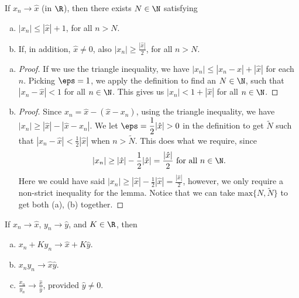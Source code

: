 \begin{nlemma}{}
	If \(x_n\to\hat{x}\) (in \(\R\)), then there exists \(N\in\N\) satisfying 
	\begin{enumerate}[(a)]
		\item \(|x_n|\leq |\hat{x}|+1\), for all \(n>N\).
		
		\item If, in addition, \(\hat{x}\neq 0\), also \(|x_n|\geq \displaystyle\frac{|\hat{x}|}{2}\), for all \(n>N\).
	\end{enumerate}
\end{nlemma}
\begin{enumerate}[(a)]
	\item 
	\begin{proof}
		If we use the triangle inequality, we have
		\(|x_n|\leq |x_n-\hat{x}|+|\hat{x}|\) for each \(n\). Picking \(\eps=1\), we apply the definition to find an \(N\in\N\), such that \(|x_n-\hat{x}|<1\) for all \(n\in\N\). This gives us \(|x_n|<1+|\hat{x}|\) for all \(n\in\N\). 
	\end{proof}
	
	\item 
	\begin{proof}
		Since \(x_n=\hat{x}-(\hat{x}-x_n)\), using the triangle inequality, we have \(|x_n|\geq |\hat{x}|-|\hat{x}-x_n|\). We let \(\eps=\displaystyle\frac{1}{2}|\hat{x}|>0\) in the definition to get \(\tilde{N}\) such that \(|x_n-\hat{x}|<\displaystyle\frac{1}{2}|\hat{x}|\) when \(n>\tilde{N}\). This does what we require, since
		\begin{equation*}
			|x_n|\geq |\hat{x}|-\frac{1}{2}|\hat{x}|=\frac{|\hat{x}|}{2}~\text{for all}~n\in\N.
		\end{equation*}
		Here we could have said \(|x_n|\geq |\hat{x}|-\displaystyle\frac{1}{2}|\hat{x}|=\displaystyle\frac{|\hat{x}|}{2}\), however, we only require a non-strict inequality for the lemma. Notice that we can take \(\text{max}\{N,\tilde{N}\}\) to get both (a), (b) together.
	\end{proof}
\end{enumerate}
\begin{proposition}
	If \(x_n\to\hat{x}\), \(y_n\to\hat{y}\), and \(K\in\R\), then 
	\begin{enumerate}[(a)]
		\item \(x_n+Ky_n\to\hat{x}+K\hat{y}\).
		
		\item \(x_ny_n\to\hat{x}\hat{y}\).
		
		\item \(\displaystyle\frac{x_n}{y_n}\to\displaystyle\frac{\hat{x}}{\hat{y}}\), provided \(\hat{y}\neq 0\).
	\end{enumerate}
\end{proposition}
